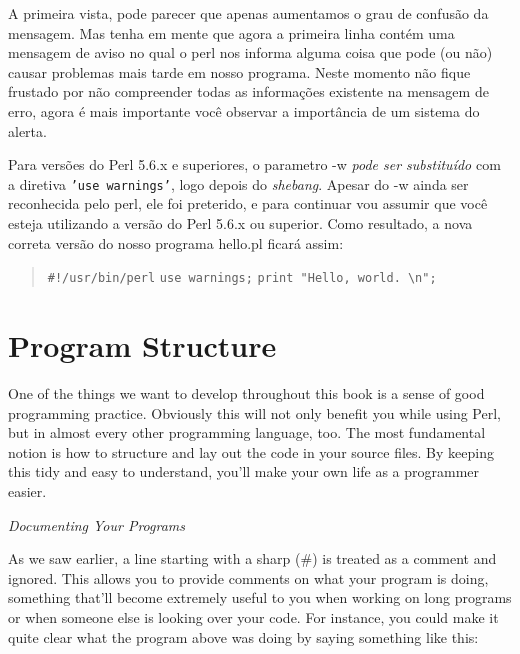 \documentclass[a4paper,12pt,twoside]{book}
\newenvironment{code}{\begin{quote}}{\end{quote}}
\begin{document}
\noindent A primeira vista, pode parecer que apenas aumentamos o grau de confusão 
da mensagem. Mas tenha em mente que agora a primeira linha contém uma mensagem de
aviso no qual o perl nos informa alguma coisa que pode (ou não) causar problemas 
mais tarde em nosso programa. Neste momento não fique frustado por não compreender 
todas as informações existente na mensagem de erro, agora é mais importante você 
observar a importância de um sistema do alerta.\medskip

\noindent Para versões do Perl 5.6.x e superiores, o parametro -w \textit{pode ser substituído}
com a diretiva \texttt{'use warnings'}, logo depois do \textit{shebang}. 
Apesar do -w ainda ser reconhecida pelo perl, ele foi preterido, 
e para continuar vou assumir que você esteja utilizando a versão do Perl 5.6.x ou superior.
Como resultado, a nova correta versão do nosso programa hello.pl ficará assim:\medskip

\begin{code}
  \texttt{\#!/usr/bin/perl}\medskip
  \texttt{use warnings;}\medskip
  \texttt{print "Hello, world. \textbackslash n";}\medskip
\end{code}


\section{Program Structure}

\noindent 

\noindent One of the things we want to develop throughout this book is a sense of good programming practice. Obviously this will not only benefit you while using Perl, but in almost every other programming language, too. The most fundamental notion is how to structure and lay out the code in your source files. By keeping this tidy and easy to understand, you'll make your own life as a programmer easier.

\noindent 

\noindent \textit{Documenting Your Programs}

\noindent As we saw earlier, a line starting with a sharp (\#) is treated as a comment and ignored. This allows you to provide comments on what your program is doing, something that'll become extremely useful to you when working on long programs or when someone else is looking over your code. For instance, you could make it quite clear what the program above was doing by saying something like this:

\noindent 
\end{document}
